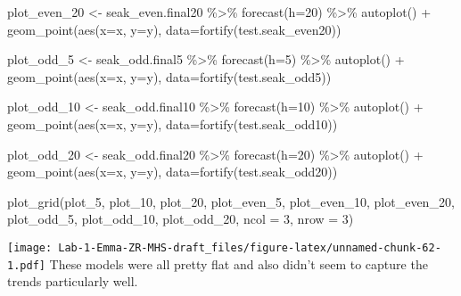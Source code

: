\documentclass[
]{article}
\newenvironment{Shaded}{\begin{snugshade}}{\end{snugshade}}
\newcommand{\AttributeTok}[1]{\textcolor[rgb]{0.77,0.63,0.00}{#1}}
\newcommand{\DecValTok}[1]{\textcolor[rgb]{0.00,0.00,0.81}{#1}}
\newcommand{\FunctionTok}[1]{\textcolor[rgb]{0.00,0.00,0.00}{#1}}
\newcommand{\NormalTok}[1]{#1}
\newcommand{\OtherTok}[1]{\textcolor[rgb]{0.56,0.35,0.01}{#1}}
\newcommand{\SpecialCharTok}[1]{\textcolor[rgb]{0.00,0.00,0.00}{#1}}
\begin{document}
\begin{Shaded}
\begin{Highlighting}[]
\NormalTok{plot\_even\_20 }\OtherTok{\textless{}{-}}\NormalTok{ seak\_even.final20 }\SpecialCharTok{\%\textgreater{}\%}
  \FunctionTok{forecast}\NormalTok{(}\AttributeTok{h=}\DecValTok{20}\NormalTok{) }\SpecialCharTok{\%\textgreater{}\%}
  \FunctionTok{autoplot}\NormalTok{() }\SpecialCharTok{+} \FunctionTok{geom\_point}\NormalTok{(}\FunctionTok{aes}\NormalTok{(}\AttributeTok{x=}\NormalTok{x, }\AttributeTok{y=}\NormalTok{y), }\AttributeTok{data=}\FunctionTok{fortify}\NormalTok{(test.seak\_even20))}

\NormalTok{plot\_odd\_5 }\OtherTok{\textless{}{-}}\NormalTok{ seak\_odd.final5 }\SpecialCharTok{\%\textgreater{}\%}
  \FunctionTok{forecast}\NormalTok{(}\AttributeTok{h=}\DecValTok{5}\NormalTok{) }\SpecialCharTok{\%\textgreater{}\%}
  \FunctionTok{autoplot}\NormalTok{() }\SpecialCharTok{+} \FunctionTok{geom\_point}\NormalTok{(}\FunctionTok{aes}\NormalTok{(}\AttributeTok{x=}\NormalTok{x, }\AttributeTok{y=}\NormalTok{y), }\AttributeTok{data=}\FunctionTok{fortify}\NormalTok{(test.seak\_odd5))}

\NormalTok{plot\_odd\_10 }\OtherTok{\textless{}{-}}\NormalTok{ seak\_odd.final10 }\SpecialCharTok{\%\textgreater{}\%}
  \FunctionTok{forecast}\NormalTok{(}\AttributeTok{h=}\DecValTok{10}\NormalTok{) }\SpecialCharTok{\%\textgreater{}\%}
  \FunctionTok{autoplot}\NormalTok{() }\SpecialCharTok{+} \FunctionTok{geom\_point}\NormalTok{(}\FunctionTok{aes}\NormalTok{(}\AttributeTok{x=}\NormalTok{x, }\AttributeTok{y=}\NormalTok{y), }\AttributeTok{data=}\FunctionTok{fortify}\NormalTok{(test.seak\_odd10))}

\NormalTok{plot\_odd\_20 }\OtherTok{\textless{}{-}}\NormalTok{ seak\_odd.final20 }\SpecialCharTok{\%\textgreater{}\%}
  \FunctionTok{forecast}\NormalTok{(}\AttributeTok{h=}\DecValTok{20}\NormalTok{) }\SpecialCharTok{\%\textgreater{}\%}
  \FunctionTok{autoplot}\NormalTok{() }\SpecialCharTok{+} \FunctionTok{geom\_point}\NormalTok{(}\FunctionTok{aes}\NormalTok{(}\AttributeTok{x=}\NormalTok{x, }\AttributeTok{y=}\NormalTok{y), }\AttributeTok{data=}\FunctionTok{fortify}\NormalTok{(test.seak\_odd20))}

\FunctionTok{plot\_grid}\NormalTok{(plot\_5, plot\_10, plot\_20, plot\_even\_5, plot\_even\_10, plot\_even\_20, plot\_odd\_5, plot\_odd\_10, plot\_odd\_20, }\AttributeTok{ncol =} \DecValTok{3}\NormalTok{, }\AttributeTok{nrow =} \DecValTok{3}\NormalTok{)}
\end{Highlighting}
\end{Shaded}

\texttt{[image: Lab-1-Emma-ZR-MHS-draft\_files/figure-latex/unnamed-chunk-62-1.pdf]}
These models were all pretty flat and also didn't seem to capture the
trends particularly well.
\end{document}
